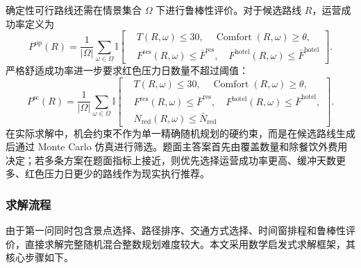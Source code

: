 \documentclass[UTF8,zihao=-4,a4paper]{ctexart}
\begin{document}
确定性可行路线还需在情景集合 $\Omega$ 下进行鲁棒性评价。对于候选路线 $R$，运营成功率定义为
\[
P^{\mathrm{op}}(R)
=
\frac{1}{|\Omega|}
\sum_{\omega\in\Omega}
\mathbb{I}\!\left[
\begin{aligned}
&T(R,\omega)\leq 30,\quad
\operatorname{Comfort}(R,\omega)\geq \theta,\\
&F^{\mathrm{res}}(R,\omega)\leq \bar{F}^{\mathrm{res}},\quad
F^{\mathrm{hotel}}(R,\omega)\leq \bar{F}^{\mathrm{hotel}}
\end{aligned}
\right].
\]
严格舒适成功率进一步要求红色压力日数量不超过阈值：
\[
P^{\mathrm{sc}}(R)
=
\frac{1}{|\Omega|}
\sum_{\omega\in\Omega}
\mathbb{I}\!\left[
\begin{aligned}
&T(R,\omega)\leq 30,\quad
\operatorname{Comfort}(R,\omega)\geq \theta,\\
&F^{\mathrm{res}}(R,\omega)\leq \bar{F}^{\mathrm{res}},\quad
F^{\mathrm{hotel}}(R,\omega)\leq \bar{F}^{\mathrm{hotel}},\\
&N_{\mathrm{red}}(R,\omega)\leq \bar{N}_{\mathrm{red}}
\end{aligned}
\right].
\]
在实际求解中，机会约束不作为单一精确随机规划的硬约束，而是在候选路线生成后通过 Monte Carlo 仿真进行筛选。题面主答案首先由覆盖数量和除餐饮外费用决定；若多条方案在题面指标上接近，则优先选择运营成功率更高、缓冲天数更多、红色压力日更少的路线作为现实执行推荐。

\subsubsection{求解流程}
\label{subsubsec:q1_solution_process}

由于第一问同时包含景点选择、路径排序、交通方式选择、时间窗排程和鲁棒性评价，直接求解完整随机混合整数规划难度较大。本文采用数学启发式求解框架，其核心步骤如下。
\end{document}
